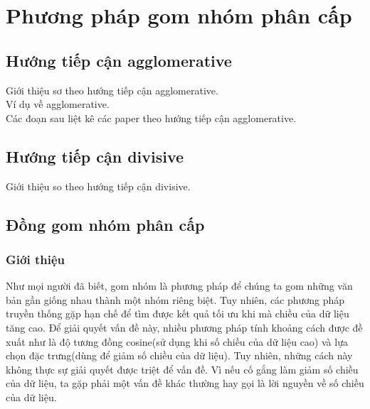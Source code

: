\chapter{Phương pháp gom nhóm phân cấp}
\label{Chapter2}

\section{Hướng tiếp cận agglomerative}
\hspace{10mm}Giới thiệu sơ theo hướng tiếp cận agglomerative.\\
\hspace*{10mm}Ví dụ về agglomerative.\\
\hspace*{10mm}Các đoạn sau liệt kê các paper theo hướng tiếp cận agglomerative.\\


\section{Hướng tiếp cận divisive}
\hspace{10mm}Giới thiệu so theo hướng tiếp cận divisive.\\

\section{Đồng gom nhóm phân cấp}
\subsection{Giới thiệu}
\noindent
Như mọi người đã biết, gom nhóm là phương pháp để chúng ta gom những văn bản gần giống nhau thành một nhóm riêng biệt. %
Tuy nhiên, %
các phương pháp truyền thống gặp hạn chế để tìm được kết quả tối ưu khi mà chiều của dữ liệu tăng cao. 
Để giải quyết vấn đề này, nhiều phương pháp tính khoảng cách được đề xuất như là độ tương đồng cosine(sử dụng khi số chiều của dữ liệu cao) và lựa chọn đặc trưng(dùng để giảm số chiều của dữ liệu). 
Tuy nhiên, những cách này không thực sự giải quyết được triệt để vấn đề. 
Vì nếu cố gắng làm giảm số chiều của dữ liệu, ta gặp phải một vấn đề khác thường hay gọi là lời nguyền về số chiều của dữ liệu. %

